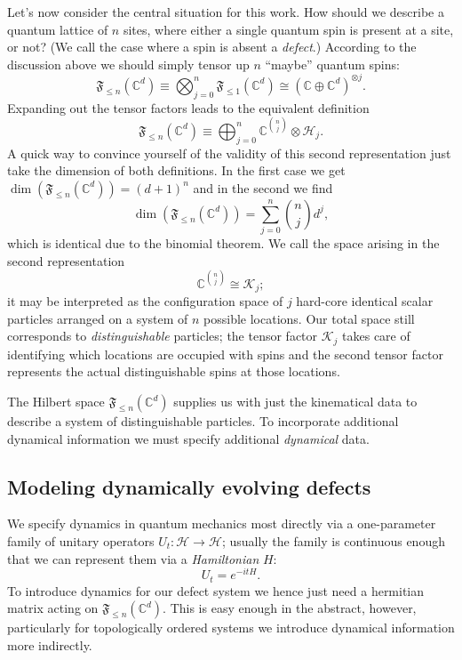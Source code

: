 Let's now consider the central situation for this work. How should we describe a quantum lattice of $n$ sites, where either a single quantum spin is present at a site, or not? (We call the case where a spin is absent a \emph{defect}.) According to the discussion above we should simply tensor up $n$ ``maybe'' quantum spins:
\begin{equation}
\mathfrak{F}_{\le n}(\mathbb{C}^d) \equiv \bigotimes_{j=0}^n \mathfrak{F}_{\le 1}(\mathbb{C}^d) \cong (\mathbb{C}\oplus \mathbb{C}^d)^{\otimes j}.
\end{equation}
Expanding out the tensor factors leads to the equivalent definition
\begin{equation}
\mathfrak{F}_{\le n}(\mathbb{C}^d) \equiv \bigoplus_{j=0}^n \mathbb{C}^{\binom{n}{j}}\otimes \mathcal{H}_j.
\end{equation}
A quick way to convince yourself of the validity of this second representation just take the dimension of both definitions. In the first case we get $\dim(\mathfrak{F}_{\le n}(\mathbb{C}^d)) = (d+1)^n$ and in the second we find
\begin{equation}
\dim(\mathfrak{F}_{\le n}(\mathbb{C}^d)) = \sum_{j=0}^n \binom{n}{j} d^j,
\end{equation}
which is identical due to the binomial theorem. We call the space arising in the second representation
\begin{equation}
\mathbb{C}^{\binom{n}{j}} \cong \mathcal{K}_{j};
\end{equation}
it may be interpreted as the configuration space of $j$ hard-core identical scalar particles arranged on a system of $n$ possible locations. Our total space still corresponds to \emph{distinguishable} particles; the tensor factor $\mathcal{K}_j$ takes care of identifying which locations are occupied with spins and the second tensor factor represents the actual distinguishable spins at those locations.

The Hilbert space $\mathfrak{F}_{\le n}(\mathbb{C}^d)$ supplies us with just the kinematical data to describe a system of distinguishable particles. To incorporate additional dynamical information we must specify additional \emph{dynamical} data.

\subsection{Modeling dynamically evolving defects}
\label{Intro_dynamics}

We specify dynamics in quantum mechanics most directly via a one-parameter family of unitary operators $U_t:\mathcal{H}\rightarrow\mathcal{H}$; usually the family is continuous enough that we can represent them via a \emph{Hamiltonian} $H$:
\begin{equation}
U_t = e^{-it H}.
\end{equation}
To introduce dynamics for our defect system we hence just need a hermitian matrix acting on $\mathfrak{F}_{\le n}(\mathbb{C}^d)$. This is easy enough in the abstract, however, particularly for topologically ordered systems we introduce dynamical information more indirectly.

